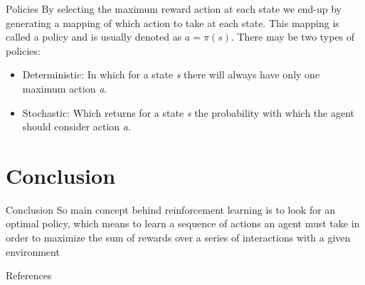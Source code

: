 \documentclass[10pt]{beamer}
\begin{document}
\begin{frame}{Policies}
    By selecting the maximum reward action at each state we end-up by generating a mapping of which action to take at each state. This mapping is called a policy and is usually denoted as $a = \pi(s)$. There may be two types of policies:
    \begin{itemize}
        \item Deterministic: In which for a state \textit{s} there will always have only one maximum action \textit{a}.
        \item Stochastic: Which returns for a state \textit{s} the probability with which the agent should consider action \textit{a}.
    \end{itemize}
\end{frame}

\section{Conclusion}
\begin{frame}{Conclusion}
    So main concept behind reinforcement learning is to look for an optimal policy, which means to learn a sequence of actions an agent must take in order to maximize the sum of rewards over a series of interactions with a given environment
\end{frame}

\nocite{*}

\begin{frame}[allowframebreaks]{References}

  
  

\end{frame}
\end{document}
